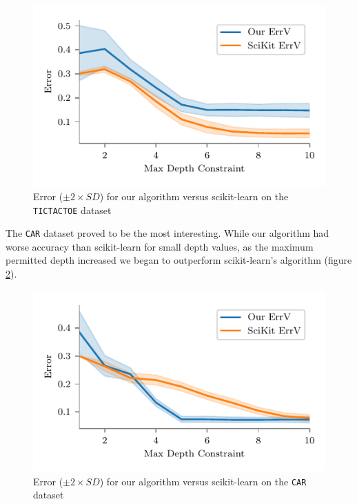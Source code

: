 \documentclass[screen, authorversion, nonacm, sigconf]{acmart}
\begin{document}
\begin{figure}
  \centering
  \includegraphics[width=\columnwidth]{figures/chart_ours_v_scikit_variance_tictactoe.pdf}
  \caption{Error ($\pm 2 \times SD$) for our algorithm versus scikit-learn on the \texttt{TICTACTOE} dataset}
  \label{fig:tttoursvscikit}
\end{figure}

The \texttt{CAR} dataset proved to be the most interesting. While our algorithm had worse accuracy than scikit-learn for small depth values, as the maximum permitted depth increased we began to outperform scikit-learn's algorithm (figure \ref{fig:caroursvscikit}).

\begin{figure}
  \centering
  \includegraphics[width=\columnwidth]{figures/chart_ours_v_scikit_variance_car.pdf}
  \caption{Error ($\pm 2 \times SD$) for our algorithm versus scikit-learn on the \texttt{CAR} dataset}
  \label{fig:caroursvscikit}
\end{figure}
\end{document}

